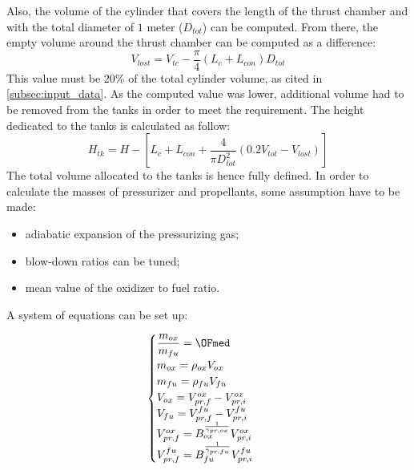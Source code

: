 Also, the volume of the cylinder that covers the length of the thrust chamber and with the total diameter of $1$ meter ($D_{tot}$) can be computed. From there, the empty volume around the thrust chamber can be computed as a difference:
\begin{equation}
    V_{lost} =  V_{tc} - \frac{\pi}{4} \left(L_{c} + L_{con}\right) D_{tot}
\end{equation}
This value must be $20$\% of the total cylinder volume, as cited in \autoref{subsec:input_data}. As the computed value was lower, additional volume had to be removed from the tanks in order to meet the requirement. The height dedicated to the tanks is calculated as follow:
\begin{equation}
    H_{tk} =  H - \left[L_{c} + L_{con} + \frac{4}{\pi D_{tot}^2}\left( 0.2 V_{tot} - V_{lost}\right) \right]
\end{equation}
The total volume allocated to the tanks is hence fully defined. 
In order to calculate the masses of pressurizer and propellants, some assumption have to be made:
\begin{itemize}
    \item adiabatic expansion of the pressurizing gas;
    \item blow-down ratios can be tuned;
    \item mean value of the oxidizer to fuel ratio.
\end{itemize}

A system of equations can be set up:

\begin{equation}
    \begin{cases}
    \dfrac{m_{ox}}{m_{fu}} = \OFmed\\
     m_{ox} = \rho_{ox}V_{ox}\\
     m_{fu} = \rho_{fu}V_{fu}\\
     V_{ox} = V_{pr, f}^{ox} - V_{pr, i}^{ox}\\
     V_{fu} = V_{pr, f}^{fu} - V_{pr, i}^{fu}\\
     V_{pr,f}^{ox} = B_{ox}^{\frac{1}{\gamma_{pr,ox}}}V_{pr, i}^{ox}\\
     V_{pr,f}^{fu} = B_{fu}^{\frac{1}{\gamma_{pr,fu}}}V_{pr, i}^{fu}\\
     \end{cases}\
     \label{eq:sistema_fata_turchina}
\end{equation}

\vspace{0.15cm}


